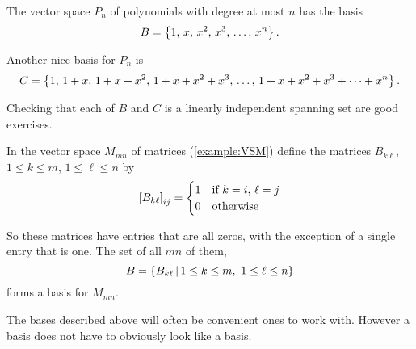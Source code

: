 \documentclass{ximera}
\begin{document}
\begin{example}
  The vector space $P_n$ of polynomials with degree at most $n$ has
  the basis
  \[
    B=\left\{1,\,x,\,x^2,\,x^3,\,\ldots,\,x^n\right\}.
  \]
  
  Another nice basis for $P_n$ is
  \[
    C=\left\{1,\,1+x,\,1+x+x^2,\,1+x+x^2+x^3,\,\ldots,\,1+x+x^2+x^3+\cdots+x^n\right\}.
  \]

  Checking that each of $B$ and $C$ is a linearly independent spanning set are good exercises.
\end{example}

\begin{example}
  In the vector space $M_{mn}$ of matrices (\ref{example:VSM})  define the matrices $B_{k\ell}$, $1\leq k\leq m$, $1\leq\ell\leq n$ by
  \[
    \left\lbrack B_{k\ell}\right\rbrack_{ij}=\begin{cases}
      1&\text{if }k=i,\,\ell=j\\
      0&\text{otherwise}
    \end{cases}
  \]
  
  So these matrices have entries that are all zeros, with the exception of a single entry that is one.  The set of all $mn$ of them,
  \[
    B=\left\lbrace B_{k\ell}\,\middle|\,1\leq k\leq m,\ 1\leq\ell\leq n\right\rbrace
  \]
  forms a basis for $M_{mn}$.
\end{example}

The bases described above will often be convenient ones to work with.
However a basis does not have to obviously look like a basis.
\end{document}
